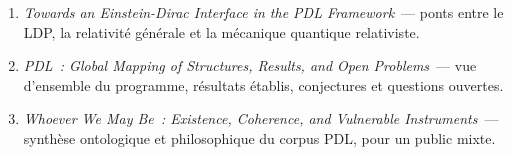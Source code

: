 \documentclass[12pt, a4paper, openright]{book}
\begin{document}
\begin{enumerate}
\item \textit{Towards an Einstein-Dirac Interface in the PDL Framework}~--- ponts entre le LDP, la relativité générale et la mécanique quantique relativiste.

\item \textit{PDL~: Global Mapping of Structures, Results, and Open Problems}~--- vue d'ensemble du programme, résultats établis, conjectures et questions ouvertes.

\item \textit{Whoever We May Be~: Existence, Coherence, and Vulnerable Instruments}~--- synthèse ontologique et philosophique du corpus PDL, pour un public mixte.

\end{enumerate}

\end{document}

